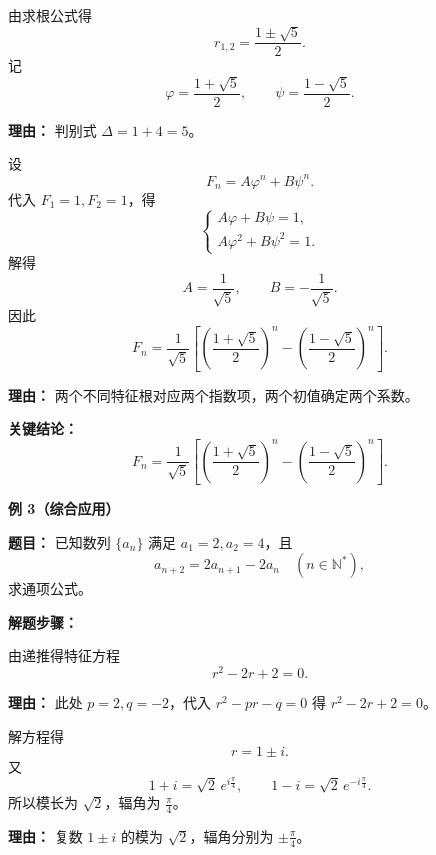 \begin{examplebox}
\begin{description}[style=nextline, leftmargin=2.8em, labelsep=0.5em, itemsep=0.45em]
		\item[\textbf{第二步（求特征根）：}]
		      由求根公式得
		      \[
			      r_{1,2}=\frac{1\pm\sqrt5}{2}.
		      \]
		      记
		      \[
			      \varphi=\frac{1+\sqrt5}{2},\qquad \psi=\frac{1-\sqrt5}{2}.
		      \]
		      \par\textbf{理由：} 判别式 \(\Delta=1+4=5\)。

		\item[\textbf{第三步（通项并定系数）：}]
		      设
		      \[
			      F_n=A\varphi^n+B\psi^n.
		      \]
		      代入 \(F_1=1,F_2=1\)，得
		      \[
			      \begin{cases}
				      A\varphi+B\psi=1, \\[4pt]
				      A\varphi^2+B\psi^2=1.
			      \end{cases}
		      \]
		      解得
		      \[
			      A=\frac1{\sqrt5},\qquad B=-\frac1{\sqrt5}.
		      \]
		      因此
		      \[
			      F_n=\frac1{\sqrt5}\left[\left(\frac{1+\sqrt5}{2}\right)^n-
				      \left(\frac{1-\sqrt5}{2}\right)^n\right].
		      \]
		      \par\textbf{理由：} 两个不同特征根对应两个指数项，两个初值确定两个系数。
	\end{description}

	\textbf{\textcolor{CExample}{关键结论：}}
	\[
		\boxed{F_n=\frac1{\sqrt5}\left[\left(\frac{1+\sqrt5}{2}\right)^n-
				\left(\frac{1-\sqrt5}{2}\right)^n\right]}.
	\]

	\medskip
	\textbf{\textcolor{CExample}{例 3（综合应用）}}

	\textbf{\textcolor{CExample}{题目：}}
	已知数列 \(\{a_n\}\) 满足 \(a_1=2,a_2=4\)，且
	\[
		a_{n+2}=2a_{n+1}-2a_n\quad(n\in\mathbb N^*),
	\]
	求通项公式。

	\textbf{\textcolor{CExample}{解题步骤：}}
	\begin{description}[style=nextline, leftmargin=2.8em, labelsep=0.5em, itemsep=0.45em]
		\item[\textbf{第一步（写特征方程）：}]
		      由递推得特征方程
		      \[
			      r^2-2r+2=0.
		      \]
		      \par\textbf{理由：} 此处 \(p=2,q=-2\)，代入 \(r^2-pr-q=0\) 得 \(r^2-2r+2=0\)。

		\item[\textbf{第二步（求根并化三角形式）：}]
		      解方程得
		      \[
			      r=1\pm i.
		      \]
		      又
		      \[
			      1+i=\sqrt2\,e^{i\frac{\pi}{4}},
			      \qquad
			      1-i=\sqrt2\,e^{-i\frac{\pi}{4}}.
		      \]
		      所以模长为 \(\sqrt2\)，辐角为 \(\frac{\pi}{4}\)。
		      \par\textbf{理由：} 复数 \(1\pm i\) 的模为 \(\sqrt2\)，辐角分别为 \(\pm\frac{\pi}{4}\)。


\end{description}
\end{examplebox}
